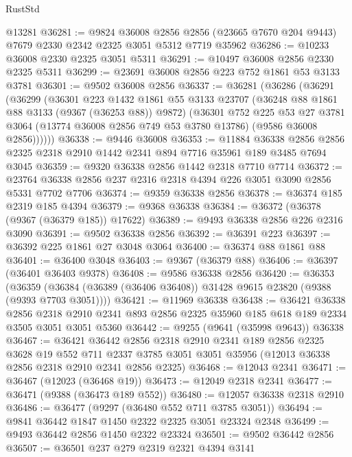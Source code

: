 \begin{lexlean}{RustStd}
\begin{coremodule}
    @13281
@36281 := @9824
    @36008
    @2856
    @2856
    (@23665 @7670 @204 @9443)
    @7679
    @2330
    @2342
    @2325
    @3051
    @5312
    @7719
    @35962
@36286 := @10233 @36008 @2330 @2325 @3051 @5311
@36291 := @10497 @36008 @2856 @2330 @2325 @5311
@36299 := @23691 @36008 @2856 @223 @752 @1861 @53 @3133 @3781
@36301 := @9502 @36008 @2856
@36337 := @36281
    (@36286
      (@36291
        (@36299
          (@36301
            @223
            @1432
            @1861
            @55
            @3133
            @23707
            (@36248 @88 @1861 @88 @3133 (@9367 (@36253 @88)) @9872)
            (@36301
              @752
              @225
              @53
              @27
              @3781
              @3064
              (@13774 @36008 @2856 @749 @53 @3780 @13786)
              (@9586 @36008 @2856))))))
@36338 := @9446 @36008
@36353 := @11884
    @36338
    @2856
    @2856
    @2325
    @2318
    @2910
    @1442
    @2341
    @894
    @7716
    @35961
    @189
    @3485
    @7694
    @3045
@36359 := @9320 @36338 @2856 @1442 @2318 @7710 @7714
@36372 := @23764 @36338 @2856 @237 @2316 @2318 @4394 @226 @3051 @3090 @2856 @5331 @7702 @7706
@36374 := @9359 @36338 @2856
@36378 := @36374 @185 @2319 @185 @4394
@36379 := @9368 @36338
@36384 := @36372 (@36378 (@9367 (@36379 @185)) @17622)
@36389 := @9493 @36338 @2856 @226 @2316 @3090
@36391 := @9502 @36338 @2856
@36392 := @36391 @223
@36397 := @36392 @225 @1861 @27 @3048 @3064
@36400 := @36374 @88 @1861 @88
@36401 := @36400 @3048
@36403 := @9367 (@36379 @88)
@36406 := @36397 (@36401 @36403 @9378)
@36408 := @9586 @36338 @2856
@36420 := @36353
    (@36359 (@36384 (@36389 (@36406 @36408)) @31428 @9615 @23820 (@9388 (@9393 @7703 @3051))))
@36421 := @11969 @36338
@36438 := @36421
    @36338
    @2856
    @2318
    @2910
    @2341
    @893
    @2856
    @2325
    @35960
    @185
    @618
    @189
    @2334
    @3505
    @3051
    @3051
    @5360
@36442 := @9255 (@9641 (@35998 @9643)) @36338
@36467 := @36421
    @36442
    @2856
    @2318
    @2910
    @2341
    @189
    @2856
    @2325
    @3628
    @19
    @552
    @711
    @2337
    @3785
    @3051
    @3051
    @35956
    (@12013 @36338 @2856 @2318 @2910 @2341 @2856 @2325)
@36468 := @12043 @2341
@36471 := @36467 (@12023 (@36468 @19))
@36473 := @12049 @2318 @2341
@36477 := @36471 (@9388 (@36473 @189 @552))
@36480 := @12057 @36338 @2318 @2910
@36486 := @36477 (@9297 (@36480 @552 @711 @3785 @3051))
@36494 := @9841 @36442 @1847 @1450 @2322 @2325 @3051 @23324 @2348
@36499 := @9493 @36442 @2856 @1450 @2322 @23324
@36501 := @9502 @36442 @2856
@36507 := @36501 @237 @279 @2319 @2321 @4394 @3141

\end{coremodule}
\end{lexlean}
